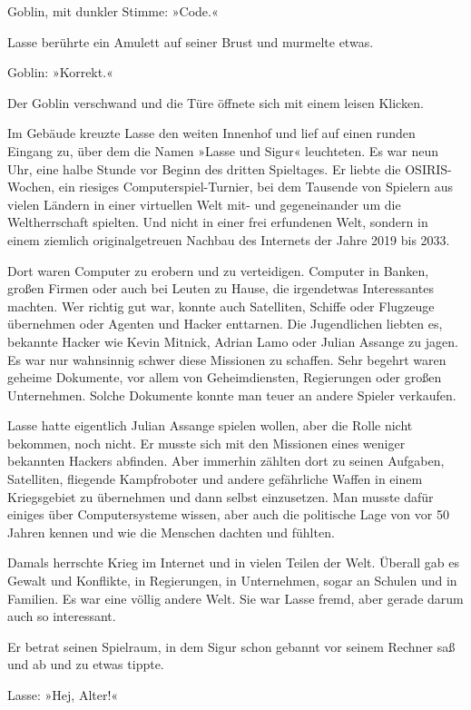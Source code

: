 Goblin, mit dunkler Stimme: »Code.«

Lasse berührte ein Amulett auf seiner Brust und murmelte etwas.

Goblin: »Korrekt.«

Der Goblin verschwand und die Türe öffnete sich mit einem leisen Klicken.

Im Gebäude kreuzte Lasse den weiten Innenhof und lief auf einen runden Eingang zu, über dem die Namen »Lasse und Sigur« leuchteten.
Es war neun Uhr, eine halbe Stunde vor Beginn des dritten Spieltages.
Er liebte die OSIRIS-Wochen, ein riesiges Computerspiel-Turnier, bei dem Tausende von Spielern aus vielen Ländern in einer virtuellen Welt mit- und gegeneinander um die Weltherrschaft spielten.
Und nicht in einer frei erfundenen Welt, sondern in einem ziemlich originalgetreuen Nachbau des Internets der Jahre 2019 bis 2033.

Dort waren Computer zu erobern und zu verteidigen.
Computer in Banken, großen Firmen oder auch bei Leuten zu Hause, die irgendetwas Interessantes machten.
Wer richtig gut war, konnte auch Satelliten, Schiffe oder Flugzeuge übernehmen oder Agenten und Hacker enttarnen.
Die Jugendlichen liebten es, bekannte Hacker wie Kevin Mitnick, Adrian Lamo oder Julian Assange zu jagen.
Es war nur wahnsinnig schwer diese Missionen zu schaffen.
Sehr begehrt waren geheime Dokumente, vor allem von Geheimdiensten, Regierungen oder großen Unternehmen.
Solche Dokumente konnte man teuer an andere Spieler verkaufen.

Lasse hatte eigentlich Julian Assange spielen wollen, aber die Rolle nicht bekommen, noch nicht.
Er musste sich mit den Missionen eines weniger bekannten Hackers abfinden.
Aber immerhin zählten dort zu seinen Aufgaben, Satelliten, fliegende Kampfroboter und andere gefährliche Waffen in einem Kriegsgebiet zu übernehmen und dann selbst einzusetzen.
Man musste dafür einiges über Computersysteme wissen, aber auch die politische Lage von vor 50 Jahren kennen und wie die Menschen dachten und fühlten.

Damals herrschte Krieg im Internet und in vielen Teilen der Welt.
Überall gab es Gewalt und Konflikte, in Regierungen, in Unternehmen, sogar an Schulen und in Familien.
Es war eine völlig andere Welt.
Sie war Lasse fremd, aber gerade darum auch so interessant.

Er betrat seinen Spielraum, in dem Sigur schon gebannt vor seinem Rechner saß und ab und zu etwas tippte.

Lasse: »Hej, Alter!«

